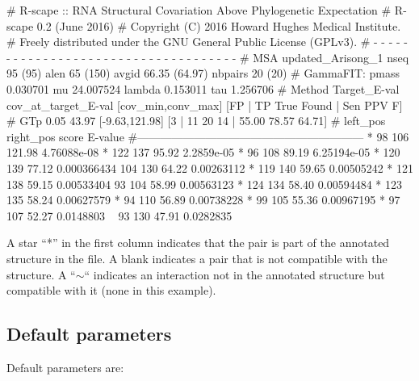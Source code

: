\begin{sreoutput}
# R-scape :: RNA Structural Covariation Above Phylogenetic Expectation
# R-scape 0.2 (June 2016)
# Copyright (C) 2016 Howard Hughes Medical Institute.
# Freely distributed under the GNU General Public License (GPLv3).
# - - - - - - - - - - - - - - - - - - - - - - - - - - - - - - - - - - - -
# MSA updated_Arisong_1 nseq 95 (95) alen 65 (150) avgid 66.35 (64.97) nbpairs 20 (20)
# GammaFIT: pmass 0.030701 mu 24.007524 lambda 0.153011 tau 1.256706
# Method Target_E-val cov_at_target_E-val [cov_min,conv_max] [FP | TP True Found | Sen PPV F] 
# GTp    0.05         43.97               [-9.63,121.98]      [3 | 11 20 14 | 55.00 78.57 64.71] 
#       left_pos       right_pos        score   E-value
#------------------------------------------------------------
*	      98	     106	121.98	4.76088e-08
*	     122	     137	95.92	2.2859e-05
*	      96	     108	89.19	6.25194e-05
*	     120	     139	77.12	0.000366434
 	     104	     130	64.22	0.00263112
*	     119	     140	59.65	0.00505242
*	     121	     138	59.15	0.00533404
 	      93	     104	58.99	0.00563123
*	     124	     134	58.40	0.00594484
*	     123	     135	58.24	0.00627579
*	      94	     110	56.89	0.00738228
*	      99	     105	55.36	0.00967195
*	      97	     107	52.27	0.0148803
~	      93	     130	47.91	0.0282835
\end{sreoutput}
A star ``*'' in the first column indicates that the pair is part of
the annotated structure in the  file. A
blank indicates a pair that is not compatible with the structure. A
``$\sim$`` indicates an interaction not in the annotated structure but
compatible with it (none in this example).

\subsection{Default parameters}

Default parameters are:

